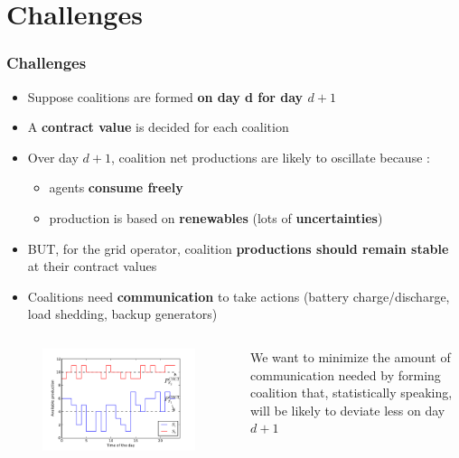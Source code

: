 \documentclass[xcolor=dvipsnames]{beamer}
\begin{document}
%
%
\section{Challenges}
\begin{frame}
	\frametitle{Challenges}
	
	\begin{footnotesize}
	\begin{itemize}
		\item Suppose coalitions are formed \textbf{on day d for day $ d +1 $}
		\item A \textbf{contract value} is decided for each coalition
		\item Over day $ d +1 $, coalition net productions are likely to oscillate because :
			\begin{itemize}
				\item {\scriptsize agents \textbf{consume freely}}
				\item {\scriptsize production is based on \textbf{renewables} (lots of \textbf{uncertainties})}
			\end{itemize}
		\item BUT, for the grid operator, coalition \textbf{productions should remain stable} at their contract values
		\item Coalitions need \textbf{communication} to take actions (battery charge/discharge, load shedding, backup generators)
	\end{itemize}
	\end{footnotesize}
	
	\begin{columns}
		\begin{column}{.7 \linewidth}
			\begin{figure}
				\includegraphics[scale=.38]{production.pdf}
			\end{figure}
		\end{column}
		\begin{column}{.3 \linewidth}
			{\scriptsize We want to minimize the amount of communication needed by forming coalition that, statistically speaking, will be likely to deviate less on day $d+1$ }
		\end{column}
	\end{columns}

\end{frame}
	
\end{document}
